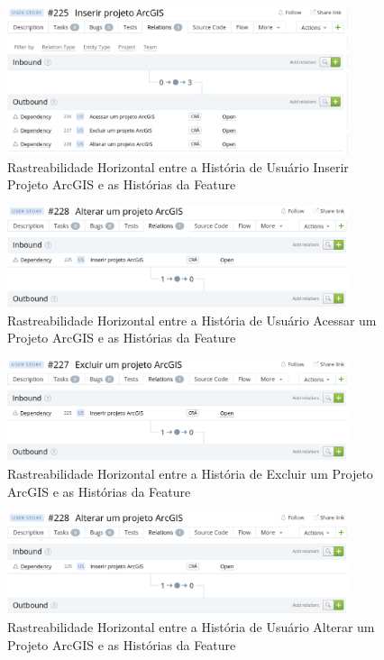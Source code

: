   \begin{figure}[!htb]
    \centering
    \includegraphics[width=10cm, keepaspectratio=false]{figuras/rastreabilidade/horizontal/gerenciar_projetos/historia_inserir_projeto.eps}
    \caption{Rastreabilidade Horizontal entre a História de Usuário Inserir Projeto ArcGIS e as Histórias da Feature}
  \end{figure}

  \begin{figure}[!htb]
    \centering
    \includegraphics[width=10cm, keepaspectratio=false]{figuras/rastreabilidade/horizontal/gerenciar_projetos/historia_alterar_projeto.eps}
    \caption{Rastreabilidade Horizontal entre a História de Usuário Acessar um Projeto ArcGIS e as Histórias da Feature}
  \end{figure}

  \begin{figure}[!htb]
    \centering
    \includegraphics[width=10cm, keepaspectratio=false]{figuras/rastreabilidade/horizontal/gerenciar_projetos/historia_excluir_projeto.eps}
    \caption{Rastreabilidade Horizontal entre a História de Excluir um Projeto ArcGIS e as Histórias da Feature}
  \end{figure}

  \begin{figure}[!htb]
    \centering
    \includegraphics[width=10cm, keepaspectratio=false]{figuras/rastreabilidade/horizontal/gerenciar_projetos/historia_alterar_projeto.eps}
    \caption{Rastreabilidade Horizontal entre a História de Usuário Alterar um Projeto ArcGIS e as Histórias da Feature}
  \end{figure}

